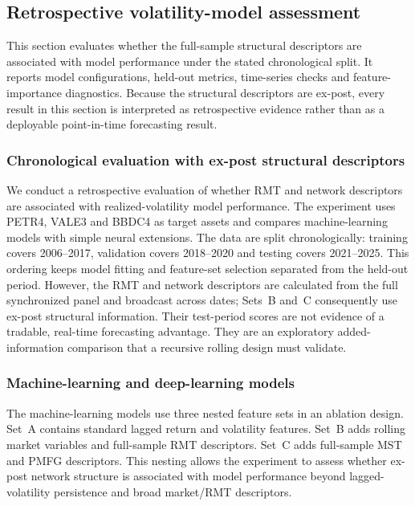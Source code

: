 \clearpage
\subsection{Retrospective volatility-model assessment}
\label{sec:forecasting}

This section evaluates whether the full-sample structural descriptors are associated with model performance under the stated chronological split. It reports model configurations, held-out metrics, time-series checks and feature-importance diagnostics. Because the structural descriptors are ex-post, every result in this section is interpreted as retrospective evidence rather than as a deployable point-in-time forecasting result.

\subsubsection{Chronological evaluation with ex-post structural descriptors}

We conduct a retrospective evaluation of whether RMT and network descriptors are associated with realized-volatility model performance. The experiment uses PETR4, VALE3 and BBDC4 as target assets and compares machine-learning models with simple neural extensions. The data are split chronologically: training covers 2006--2017, validation covers 2018--2020 and testing covers 2021--2025. This ordering keeps model fitting and feature-set selection separated from the held-out period. However, the RMT and network descriptors are calculated from the full synchronized panel and broadcast across dates; Sets~B and~C consequently use ex-post structural information. Their test-period scores are not evidence of a tradable, real-time forecasting advantage. They are an exploratory added-information comparison that a recursive rolling design must validate.

\subsubsection{Machine-learning and deep-learning models}

The machine-learning models use three nested feature sets in an ablation design. Set~A contains standard lagged return and volatility features. Set~B adds rolling market variables and full-sample RMT descriptors. Set~C adds full-sample MST and PMFG descriptors. This nesting allows the experiment to assess whether ex-post network structure is associated with model performance beyond lagged-volatility persistence and broad market/RMT descriptors.

